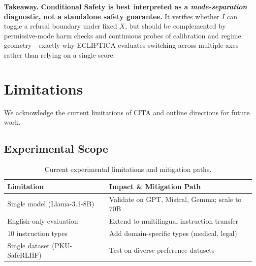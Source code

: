 \noindent\textbf{Takeaway.}
\textbf{Conditional Safety is best interpreted as a \emph{mode-separation} diagnostic, not a standalone safety guarantee.}
It verifies whether $I$ can toggle a refusal boundary under fixed $X$, but should be complemented by permissive-mode harm checks and continuous probes of calibration and regime geometry---exactly why ECLIPTICA evaluates switching across multiple axes rather than relying on a single score.

































\vspace{-2mm}
\section{Limitations}
\label{sec:limitations}

We acknowledge the current limitations of CITA and outline directions for future work.

\vspace{-2mm}
\subsection{Experimental Scope}
\label{sec:experimental_scope}

\begin{table}[H]
\centering
\small
\setlength{\tabcolsep}{4pt}
\renewcommand{\arraystretch}{1.2}
\begin{tabularx}{\columnwidth}{@{}l>{\raggedright\arraybackslash}X@{}}
\toprule
\textbf{Limitation} & \textbf{Impact \& Mitigation Path} \\
\midrule
Single model (Llama-3.1-8B) & Validate on GPT, Mistral, Gemma; scale to 70B \\ \hline
English-only evaluation & Extend to multilingual instruction transfer \\ \hline
10 instruction types & Add domain-specific types (medical, legal) \\ \hline
Single dataset (PKU-SafeRLHF) & Test on diverse preference datasets \\
\bottomrule
\end{tabularx}
\caption{Current experimental limitations and mitigation paths.}
\label{tab:limitations}
\vspace{-4mm}
\end{table}

